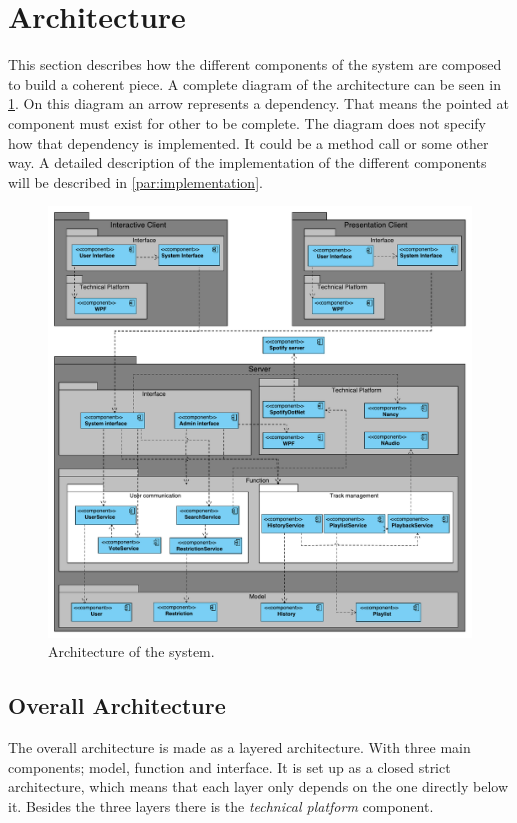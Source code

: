 \section{Architecture}
\label{sec:architecture}

This section describes how the different components of the system are
composed to build a coherent piece. A complete diagram of the architecture can be seen in \cref{fig:architecture}. On this diagram an arrow represents a dependency. That means the pointed at component must exist for other to be complete. The diagram does not specify how that dependency is implemented. It could be a method call or some other way. A detailed description of the implementation of the different components will be described in \cref{par:implementation}.

\begin{figure}[hbtp]
  \centering
  \includegraphics[width=1.2\linewidth]{Images/Arkitektur.pdf}
  \caption{Architecture of the system.}\label{fig:architecture}
\end{figure}

\subsection{Overall Architecture}
The overall architecture is made as a layered architecture. With three main components; model, function and interface. It is set up as a closed strict architecture, which means that each layer only depends on the one directly below it. Besides the three layers there is the \emph{technical platform} component.

